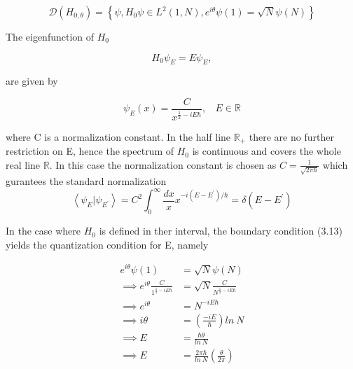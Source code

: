\documentclass[12pt]{report}
\newcommand*{\1}{\hspace{1pt}}
\begin{document}
        \begin{equation}
             \mathcal{D}(H_{0,\theta}) = \left\{\psi, H_{0}\psi \in  L^{2} (1, N), e^{i\theta}\psi(1) = \sqrt{N}\psi(N)\right\}
        \end{equation}

        The eigenfunction of $H_{0}$ 

        \begin{equation}
            H_{0}\psi_{E} = E \psi_{E},
        \end{equation}

        are given by \cite{s1}

        \begin{equation}
            \psi _{E} (x) = \frac{C}{x^{\frac{1}{2}-iE\hbar}} , \ \ \ \ E \in \mathbb{R} 
        \end{equation}

        where C is a normalization constant. In the half line $\mathbb{R}_{+}$ there are no further restriction on E, hence the spectrum of $H_{0}$ is continuous 
        and covers the whole real line $\mathbb{R}$. In this case the normalization constant is chosen as $C = \frac{1}{\sqrt{2\pi\hbar}}$ which gurantees the standard 
        normalization
        \begin{equation}
            \left\langle\psi_{E}|\psi_{E^{'}}\right\rangle = C^{2} \int_{0}^{\infty} \frac{dx}{x} x^{-i(E-E^{'})/\hbar} = \delta (E-E^{'}) 
        \end{equation}

        In the case where $H_{0}$ is defined in ther interval, the boundary condition (3.13) yields the quantization condition for E, namely

        \begin{equation*}
            \begin{split}
                e^{i\theta} \psi(1) & = \sqrt{N}\psi(N) \\ 
                \implies e^{i\theta} \frac{C}{1^{\frac{1}{2}-iE\hbar}}&= \sqrt{N}\frac{C}{N^{\frac{1}{2}-iE\hbar}} \\ 
                \implies e^{i\theta} & = N^{-iE\hbar} \\ 
                \implies i\theta & = (\frac{-iE}{\hbar})ln \ N \\
                \implies E & = \frac{\hbar\theta}{ln \ N} \\
                \implies E & = \frac{2\pi\hbar}{ln \ N}( \frac{\theta}{2\pi}) \\
            \end{split}
        \end{equation*}
\end{document}
